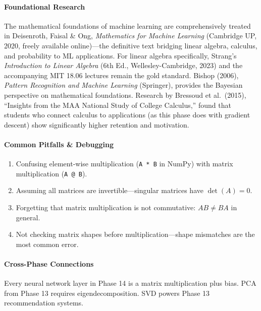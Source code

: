 \documentclass[11pt, a4paper, oneside]{report}
\begin{document}
\paragraph{Foundational Research} The mathematical foundations of machine learning are comprehensively treated in Deisenroth, Faisal \& Ong, \emph{Mathematics for Machine Learning} (Cambridge UP, 2020, freely available online)---the definitive text bridging linear algebra, calculus, and probability to ML applications. For linear algebra specifically, Strang's \emph{Introduction to Linear Algebra} (6th Ed., Wellesley-Cambridge, 2023) and the accompanying MIT 18.06 lectures remain the gold standard. Bishop (2006), \emph{Pattern Recognition and Machine Learning} (Springer), provides the Bayesian perspective on mathematical foundations. Research by Bressoud et al.\ (2015), ``Insights from the MAA National Study of College Calculus,'' found that students who connect calculus to applications (as this phase does with gradient descent) show significantly higher retention and motivation.

\paragraph{Common Pitfalls \& Debugging}
\begin{enumerate}[leftmargin=*]
\item Confusing element-wise multiplication (\texttt{A * B} in NumPy) with matrix multiplication (\texttt{A @ B}).
\item Assuming all matrices are invertible---singular matrices have $\det(A) = 0$.
\item Forgetting that matrix multiplication is not commutative: $AB \neq BA$ in general.
\item Not checking matrix shapes before multiplication---shape mismatches are the most common error.
\end{enumerate}

\paragraph{Cross-Phase Connections} Every neural network layer in Phase 14 is a matrix multiplication plus bias. PCA from Phase 13 requires eigendecomposition. SVD powers Phase 13 recommendation systems.
\end{document}
